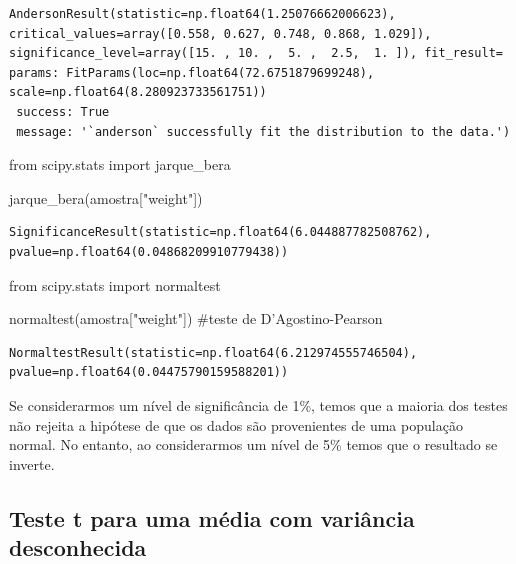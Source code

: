 \documentclass[
  letterpaper,
  DIV=11,
  numbers=noendperiod]{scrreprt}
\newenvironment{Shaded}{\begin{snugshade}}{\end{snugshade}}
\newcommand{\CommentTok}[1]{\textcolor[rgb]{0.37,0.37,0.37}{#1}}
\newcommand{\ImportTok}[1]{\textcolor[rgb]{0.00,0.46,0.62}{#1}}
\newcommand{\NormalTok}[1]{\textcolor[rgb]{0.00,0.23,0.31}{#1}}
\newcommand{\StringTok}[1]{\textcolor[rgb]{0.13,0.47,0.30}{#1}}
\begin{document}
\begin{verbatim}
AndersonResult(statistic=np.float64(1.25076662006623), critical_values=array([0.558, 0.627, 0.748, 0.868, 1.029]), significance_level=array([15. , 10. ,  5. ,  2.5,  1. ]), fit_result=  params: FitParams(loc=np.float64(72.6751879699248), scale=np.float64(8.280923733561751))
 success: True
 message: '`anderson` successfully fit the distribution to the data.')
\end{verbatim}

\begin{Shaded}
\begin{Highlighting}[]
\ImportTok{from}\NormalTok{ scipy.stats }\ImportTok{import}\NormalTok{ jarque\_bera}

\NormalTok{jarque\_bera(amostra[}\StringTok{"weight"}\NormalTok{])}
\end{Highlighting}
\end{Shaded}

\begin{verbatim}
SignificanceResult(statistic=np.float64(6.044887782508762), pvalue=np.float64(0.04868209910779438))
\end{verbatim}

\begin{Shaded}
\begin{Highlighting}[]
\ImportTok{from}\NormalTok{ scipy.stats }\ImportTok{import}\NormalTok{ normaltest}

\NormalTok{normaltest(amostra[}\StringTok{"weight"}\NormalTok{]) }\CommentTok{\#teste de D’Agostino{-}Pearson}
\end{Highlighting}
\end{Shaded}

\begin{verbatim}
NormaltestResult(statistic=np.float64(6.212974555746504), pvalue=np.float64(0.04475790159588201))
\end{verbatim}

Se considerarmos um nível de significância de 1\%, temos que a maioria
dos testes não rejeita a hipótese de que os dados são provenientes de
uma população normal. No entanto, ao considerarmos um nível de 5\% temos
que o resultado se inverte.

\subsection{Teste t para uma média com variância
desconhecida}\label{teste-t-para-uma-muxe9dia-com-variuxe2ncia-desconhecida}
\end{document}
